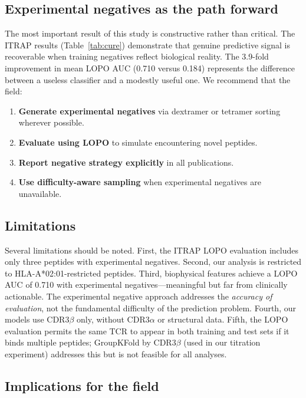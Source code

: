 \documentclass[11pt, a4paper]{article}
\begin{document}
\subsection{Experimental negatives as the path forward}

The most important result of this study is constructive rather than critical. The ITRAP results (Table~\ref{tab:cure}) demonstrate that genuine predictive signal is recoverable when training negatives reflect biological reality. The 3.9-fold improvement in mean LOPO AUC (0.710 versus 0.184) represents the difference between a useless classifier and a modestly useful one. We recommend that the field:

\begin{enumerate}[noitemsep]
    \item \textbf{Generate experimental negatives} via dextramer or tetramer sorting wherever possible.
    \item \textbf{Evaluate using LOPO} to simulate encountering novel peptides.
    \item \textbf{Report negative strategy explicitly} in all publications.
    \item \textbf{Use difficulty-aware sampling} when experimental negatives are unavailable.
\end{enumerate}

\subsection{Limitations}

Several limitations should be noted. First, the ITRAP LOPO evaluation includes only three peptides with experimental negatives. Second, our analysis is restricted to HLA-A*02:01-restricted peptides. Third, biophysical features achieve a LOPO AUC of 0.710 with experimental negatives---meaningful but far from clinically actionable. The experimental negative approach addresses the \textit{accuracy of evaluation}, not the fundamental difficulty of the prediction problem. Fourth, our models use CDR3$\beta$ only, without CDR3$\alpha$ or structural data. Fifth, the LOPO evaluation permits the same TCR to appear in both training and test sets if it binds multiple peptides; GroupKFold by CDR3$\beta$ (used in our titration experiment) addresses this but is not feasible for all analyses.

\subsection{Implications for the field}
\end{document}
